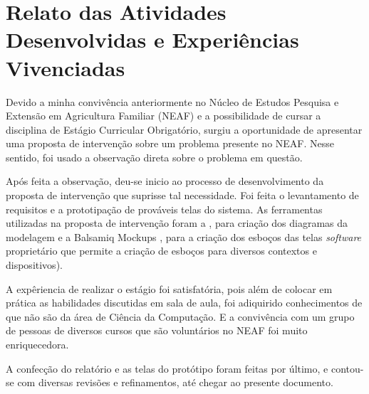 \documentclass[12pt,a4paper]{article}
\begin{document}
\section{Relato das Atividades Desenvolvidas e Experiências Vivenciadas}
Devido a minha convivência anteriormente no Núcleo de Estudos Pesquisa e Extensão em Agricultura Familiar (NEAF) e a possibilidade de cursar a disciplina de Estágio Curricular Obrigatório, surgiu a oportunidade de apresentar uma proposta de intervenção sobre um problema presente no NEAF. Nesse sentido, foi usado a observação direta sobre o problema em questão.

Após feita a observação, deu-se inicio ao processo de desenvolvimento da proposta de intervenção que suprisse tal necessidade. Foi feita o levantamento de requisitos e a prototipação de prováveis telas do sistema.
As ferramentas utilizadas na proposta de intervenção foram a \cite{astah}, para criação dos diagramas da modelagem e a Balsamiq Mockups
\cite{balsamiq}, para a criação dos esboços das telas {\it software} proprietário que permite a
criação de esboços para diversos contextos e dispositivos).

A expêriencia de realizar o estágio foi satisfatória, pois além de colocar em prática as habilidades discutidas em sala de aula, foi  adiquirido
conhecimentos de que não são da área de Ciência da Computação. E a convivência com um grupo de pessoas de diversos cursos que são voluntários
no NEAF foi muito enriquecedora. 

A confecção do relatório e as telas do protótipo foram feitas por último, e contou-se com diversas revisões e refinamentos, até chegar ao presente documento.



\end{document}
